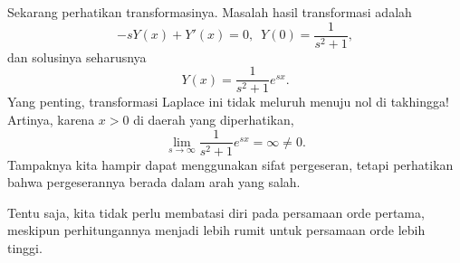Sekarang perhatikan transformasinya.  Masalah hasil transformasi adalah
\begin{equation*}
-sY(x) + Y'(x) = 0, \enspace Y(0) = \frac{1}{s^2+1} ,
\end{equation*}
dan solusinya seharusnya
\begin{equation*}
Y(x) = \frac{1}{s^2+1} e^{sx} .
\end{equation*}
Yang penting, transformasi Laplace ini tidak meluruh menuju nol di takhingga!  Artinya,
karena $x > 0$ di daerah yang diperhatikan,
\begin{equation*}
\lim_{s \to \infty}
\frac{1}{s^2+1} e^{sx}
= \infty \neq 0 .
\end{equation*}
Tampaknya kita hampir
dapat menggunakan sifat pergeseran, tetapi perhatikan bahwa pergeserannya
berada dalam arah yang salah.

\medskip

Tentu saja, kita tidak perlu membatasi diri pada persamaan orde pertama, meskipun
perhitungannya menjadi lebih rumit untuk persamaan orde lebih tinggi.

